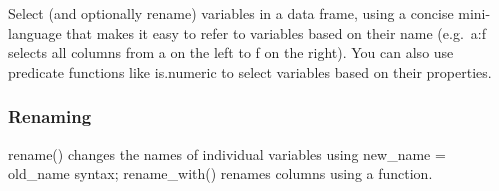\documentclass[
]{book}
\newenvironment{Shaded}{\begin{snugshade}}{\end{snugshade}}
\newcommand{\DataTypeTok}[1]{\textcolor[rgb]{0.13,0.29,0.53}{#1}}
\newcommand{\DecValTok}[1]{\textcolor[rgb]{0.00,0.00,0.81}{#1}}
\newcommand{\KeywordTok}[1]{\textcolor[rgb]{0.13,0.29,0.53}{\textbf{#1}}}
\newcommand{\NormalTok}[1]{#1}
\newcommand{\OperatorTok}[1]{\textcolor[rgb]{0.81,0.36,0.00}{\textbf{#1}}}
\newcommand{\StringTok}[1]{\textcolor[rgb]{0.31,0.60,0.02}{#1}}
\begin{document}
Select (and optionally rename) variables in a data frame, using a concise mini-language that makes it easy to refer to variables based on their name (e.g.~a:f selects all columns from a on the left to f on the right). You can also use predicate functions like is.numeric to select variables based on their properties.

\begin{Shaded}
\end{Shaded}

\hypertarget{renaming}{%
\subsubsection*{Renaming}\label{renaming}}

rename() changes the names of individual variables using new\_name = old\_name syntax; rename\_with() renames columns using a function.

\begin{Shaded}
\end{Shaded}
\end{document}
